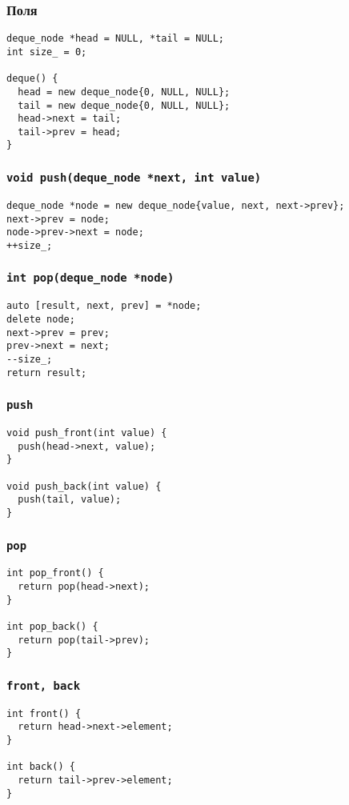 \documentclass[pdf,russian,aspectratio=169]{beamer}
\begin{document}
\begin{frame}[fragile]
  \frametitle{Поля}
  \begin{verbatim}
deque_node *head = NULL, *tail = NULL;
int size_ = 0;

deque() {
  head = new deque_node{0, NULL, NULL};
  tail = new deque_node{0, NULL, NULL};
  head->next = tail;
  tail->prev = head;
}
  \end{verbatim}
\end{frame}

\begin{frame}[fragile]
  \frametitle{\texttt{void push(deque_node *next, int value)}}
  \begin{verbatim}
deque_node *node = new deque_node{value, next, next->prev};
next->prev = node;
node->prev->next = node;
++size_;
  \end{verbatim}
\end{frame}

\begin{frame}[fragile]
  \frametitle{\texttt{int pop(deque_node *node)}}
  \begin{verbatim}
auto [result, next, prev] = *node;
delete node;
next->prev = prev;
prev->next = next;
--size_;
return result;
  \end{verbatim}
\end{frame}

\begin{frame}[fragile]
  \frametitle{\texttt{push}}
  \begin{verbatim}
void push_front(int value) {
  push(head->next, value);
}

void push_back(int value) {
  push(tail, value);
}
  \end{verbatim}
\end{frame}

\begin{frame}[fragile]
  \frametitle{\texttt{pop}}
  \begin{verbatim}
int pop_front() {
  return pop(head->next);
}

int pop_back() {
  return pop(tail->prev);
}
  \end{verbatim}
\end{frame}

\begin{frame}[fragile]
  \frametitle{\texttt{front, back}}
  \begin{verbatim}
int front() {
  return head->next->element;
}

int back() {
  return tail->prev->element;
}
  \end{verbatim}
\end{frame}
\end{document}
